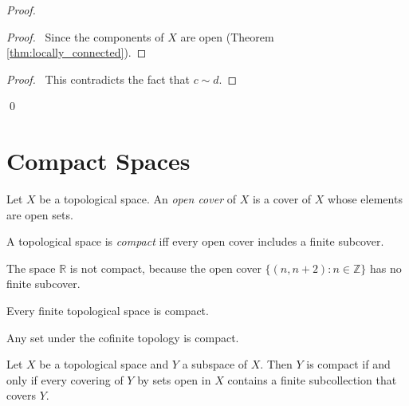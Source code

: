 \begin{proof}
\pf
{}
\begin{proof}
	\pf\ Since the components of $X$ are open (Theorem \ref{thm:locally_connected}).
\end{proof}
\qedstep
\begin{proof}
	\pf\ This contradicts the fact that $c \sim d$.
\end{proof}
\qed
\end{proof}

\section{Compact Spaces}

\begin{df}
Let $X$ be a topological space. An \emph{open cover} of $X$ is a cover of $X$ whose elements are open sets.
\end{df}

\begin{df}[Compact]
A topological space is \emph{compact} iff every open cover includes a finite subcover.
\end{df}

\begin{ex}
The space $\mathbb{R}$ is not compact, because the open cover $\{ (n, n+2) : n \in \mathbb{Z} \}$ has no finite subcover.
\end{ex}

\begin{ex}
Every finite topological space is compact.
\end{ex}

\begin{ex}
Any set under the cofinite topology is compact.
\end{ex}

\begin{lm}
\label{lm:subspace_compact}
Let $X$ be a topological space and $Y$ a subspace of $X$. Then $Y$ is compact if and only if every covering of $Y$ by sets open in $X$ contains a finite subcollection that covers $Y$.
\end{lm}


